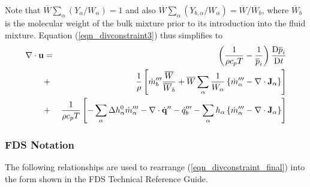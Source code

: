 \documentclass[11pt]{book}
\begin{document}
Note that $\overline{W} \sum_\alpha (Y_\alpha/W_\alpha) = 1$ and also $\overline{W} \sum_\alpha (Y_{b,\alpha}/W_\alpha) = \overline{W}/\overline{W}_b$,
where $\overline{W}_b$ is the molecular weight of the bulk mixture prior to its introduction into the fluid mixture.  Equation (\ref{eqn_divconstraint3}) thus simplifies to
\begin{eqnarray}
\label{eqn_divconstraint_final}
\Div\mathbf{u}  &=& \left(\frac{1}{\rho c_p T}  -  \frac{1}{\overline{p}_i}\right) \frac{\mbox{D}\overline{p}_i}{\mbox{D} t} \nonumber \vspace{0.3cm}\\
&+& \frac{1}{\rho} \left[ \dot{m}_b^{\tripleprime} \frac{\overline{W}}{\overline{W}_b} +  \overline{W}\sum_\alpha \frac{1}{W_\alpha} \left\{  \dot{m}_\alpha^{\tripleprime}
- \Div\mathbf{J}_{\alpha} \right\} \right] \nonumber \vspace{0.3cm}\\
&+&  \frac{1}{\rho c_p T} \left[ -\sum_\alpha \Delta h^0_\alpha \dot{m}_{\alpha}^{\tripleprime} -
\Div \dot{\mathbf{q}}^{\prime\prime} -\dq_b''' - \sum_\alpha h_{\alpha} \left\{  \dot{m}_\alpha^{\tripleprime} - \Div \mathbf{J}_{\alpha} \right\} \right]
\end{eqnarray}


\subsubsection{FDS Notation}
\label{fds_notation}

The following relationships are used to rearrange (\ref{eqn_divconstraint_final}) into
the form shown in the FDS Technical Reference Guide.
\end{document}
